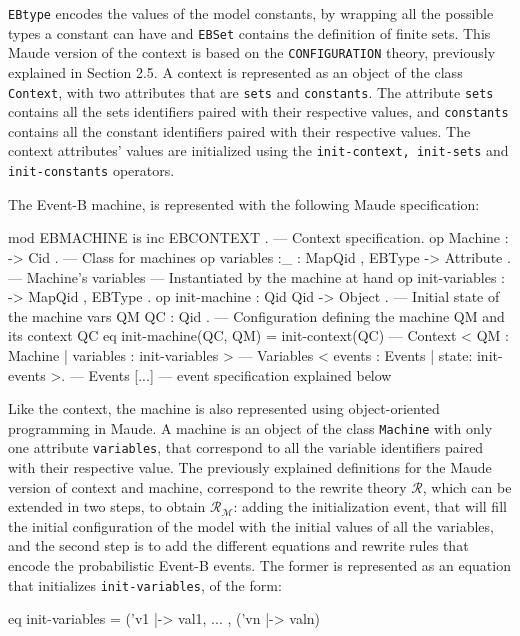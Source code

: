 \texttt{EBtype} encodes the values of the model constants, by wrapping all the possible types a constant can have and \texttt{EBSet} contains the definition of finite sets. This Maude version of the context is based on the \texttt{CONFIGURATION} theory, previously explained in Section 2.5. A context is represented as an object of the class \texttt{Context}, with two attributes that are \texttt{sets} and \texttt{constants}. The attribute \texttt{sets} contains all the sets identifiers paired with their respective values, and \texttt{constants} contains all the constant identifiers paired with their respective values. The context attributes' values are initialized using the \texttt{init-context, init-sets} and \texttt{init-constants} operators. 

The Event-B machine, is represented with the following Maude specification:
\\
\begin{maude}
mod EBMACHINE is
  inc EBCONTEXT  . --- Context specification. 
  op Machine  : -> Cid . --- Class for machines
  op variables :_ : Map{Qid , EBType} -> Attribute . --- Machine's variables 
  --- Instantiated by the machine at hand
  op init-variables : ->  Map{Qid , EBType} . 
  op init-machine : Qid Qid -> Object . --- Initial state of the machine
  vars QM QC : Qid .
  --- Configuration defining the machine QM and its context QC
  eq init-machine(QC, QM)  = 
                  init-context(QC)                              --- Context 
                  < QM : Machine | variables : init-variables > --- Variables
                  < events : Events | state: init-events >.     --- Events 
[...] --- event specification explained below
\end{maude}
Like the context, the machine is also represented using object-oriented programming in Maude. A machine is an object of the class \texttt{Machine} with only one attribute \texttt{variables}, that correspond to all the variable identifiers paired with their respective value. The previously explained definitions for the Maude version of context and machine, correspond to the rewrite theory $\mathscr{R}$, which can be extended in two steps, to obtain $\mathscr{R}_\mathscr{M}$: adding the initialization event, that will fill the initial configuration of the model with the initial values of all the variables, and the second step is to add the different equations and rewrite rules that encode the probabilistic Event-B events. The former is represented as an equation that initializes \texttt{init-variables}, of the form:
\\
\begin{maude}
    eq init-variables = ('v1 |-> val1, ... , ('vn   |-> valn)
\end{maude}

